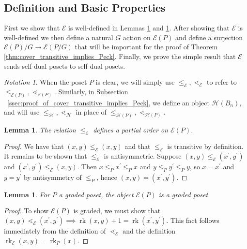 \documentclass[10 pt]{amsart}
\theoremstyle{plain}
\newtheorem{lem}[thm]{Lemma}
\theoremstyle{definition}
\theoremstyle{remark}
\newtheorem*{note*}{Notation}
\numberwithin{equation}{section}
\newcommand\ssec{\subsection}
\newcommand\rk{\operatorname{rk}}
\begin{document}
\ssec{Definition and Basic Properties}\label{ssec:definition_and_basic_properties}
First we show that $\mathcal{E}$ is well-defined in Lemmas \ref{lem:f_partial_order} and \ref{lem:FP_graded_poset}.  After showing that $\mathcal E$ is well-defined we then define a natural $G$ action on $\mathcal E(P)$ and define a surjection $\mathcal E(P)/G\rightarrow \mathcal E(P/G)$ that will be important for the proof of Theorem \ref{thm:cover_transitive_implies_Peck}. Finally, we prove the simple result that $\mathcal E$ sends self-dual posets to self-dual posets.

\begin{note*}
When the poset $P$ is clear, we will simply use $\leq_{\mathcal E},\lessdot_{\mathcal E}$ to refer to $\leq_{\mathcal E(P)},\lessdot_{\mathcal E(P)}.$ Similarly, in Subsection ~\ref{ssec:proof_of_cover_transitive_implies_Peck}, we define an object $\mathcal H(B_n),$ and will use $\leq_{\mathcal H},\lessdot_{\mathcal H}$ in place of $\leq_{\mathcal H(P)},\lessdot_{\mathcal H(P)}.$
\end{note*}

\begin{lem}\label{lem:f_partial_order}
The relation $\le_{\mathcal E}$ defines a partial order on $\mathcal E(P)$.
\end{lem}

\begin{proof}
We have that $(x, y)\le_{\mathcal E} (x, y)$ and that $\le_{\mathcal E}$ is transitive by definition.  It remains to be shown that $\le_{\mathcal E}$ is antisymmetric.  Suppose $(x, y)\le_{\mathcal E} (x^\prime, y^\prime)$ and $(x^\prime, y^\prime)\le_{\mathcal E} (x, y)$.  Then $x\le_P x^\prime \le_P x$ and $y\le_P y^\prime \le_P y$, so $x = x^\prime$ and $y=y^\prime$ by antisymmetry of $\le_P$, hence $(x, y) = (x^\prime, y^\prime)$.
\end{proof}

\begin{lem}\label{lem:FP_graded_poset}
For $P$ a graded poset, the object $\mathcal E(P)$ is a graded poset.
\end{lem}

\begin{proof}
To show $\mathcal E(P)$ is graded, we must show that $(x, y) \lessdot_{\mathcal E} (x^\prime, y^\prime) \implies \rk(x, y)+1 = \rk(x^\prime , y^\prime)$.  This fact follows immediately from the definition of $\lessdot_{\mathcal E}$ and the definition $\rk_{\mathcal E}(x, y) = \rk_P(x)$.
\end{proof}
\end{document}
